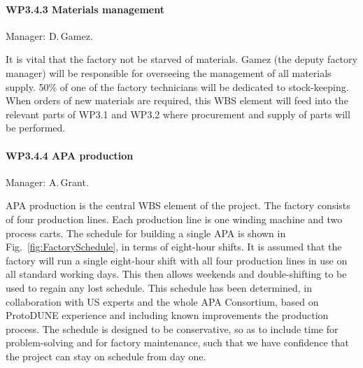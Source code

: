 \paragraph{WP3.4.3 Materials management} Manager: D.\,Gamez.

It is vital that the factory not be starved of materials. Gamez (the deputy factory manager) will be responsible for overseeing the management of all materials supply. 50\% of one of the factory technicians will be dedicated to stock-keeping. When orders of new materials are required, this WBS element will feed into the relevant parts of WP3.1 and WP3.2 where procurement and supply of parts will be performed. 

\paragraph{WP3.4.4 APA production} Manager: A.\,Grant.

APA production is the central WBS element of the project. The factory consists of four production lines. Each production line is one winding machine and two process carts. The schedule for building a single APA is shown in Fig.~\ref{fig:FactorySchedule}, in terms of eight-hour shifts. It is assumed that the factory will run a single eight-hour shift with all four production lines in use on all standard working days. This then allows weekends and double-shifting to be used to regain any lost schedule. This schedule has been determined, in collaboration with US experts and the whole APA Consortium, based on ProtoDUNE experience and including known improvements the production process. The schedule is designed to be conservative, so as to include time for problem-solving and for factory maintenance, such that we have confidence that the project can stay on schedule from day one.



